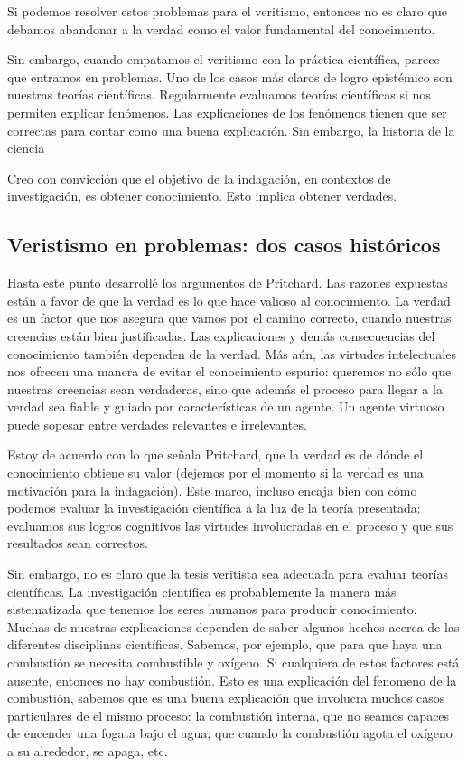 {{{{Si podemos resolver estos problemas para el veritismo, entonces no es claro que debamos abandonar a la verdad como el valor fundamental del conocimiento.

Sin embargo, cuando empatamos el veritismo con la práctica científica, parece que entramos en problemas.
Uno de los casos más claros de logro epistémico son nuestras teorías científicas.
Regularmente evaluamos teorías científicas si nos permiten explicar fenómenos.
Las explicaciones de los fenómenos tienen que ser correctas para contar como una buena explicación.
Sin embargo, la historia de la ciencia

Creo con convicción que el objetivo de la indagación, en contextos de investigación, es obtener conocimiento. Esto implica obtener verdades.

\subsection{Veristismo en problemas: dos casos históricos}

Hasta este punto desarrollé los argumentos de Pritchard.
Las razones expuestas están a favor de que la verdad es lo que hace valioso al conocimiento.
La verdad es un factor que nos asegura que vamos por el camino correcto, cuando nuestras creencias están bien justificadas.
Las explicaciones y demás consecuencias del conocimiento también dependen de la verdad.
Más aún, las virtudes intelectuales nos ofrecen una manera de evitar el conocimiento espurio: queremos no sólo que nuestras creencias sean verdaderas, sino que además el proceso para llegar a la verdad sea fiable y guiado por características de un agente.
Un agente virtuoso puede sopesar entre verdades relevantes e irrelevantes.

Estoy de acuerdo con lo que señala Pritchard, que la verdad es de dónde el conocimiento obtiene su valor (dejemos por el momento si la verdad es una motivación para la indagación).
Este marco, incluso encaja bien con cómo podemos evaluar la investigación científica a la luz de la teoría presentada: evaluamos sus logros cognitivos las virtudes involucradas en el proceso y que sus resultados sean correctos.

Sin embargo, no es claro que la tesis veritista sea adecuada para evaluar teorías científicas.
La investigación científica es probablemente la manera más sistematizada que tenemos los seres humanos para producir conocimiento.
Muchas de nuestras explicaciones dependen de saber algunos hechos acerca de las diferentes disciplinas científicas.
Sabemos, por ejemplo, que para que haya una combustión se necesita combustible y oxígeno.
Si cualquiera de estos factores está ausente, entonces no hay combustión.
Esto es una explicación del fenomeno de la combustión, sabemos que es una buena explicación que involucra muchos casos particulares de el mismo proceso: la combustión interna, que no seamos capaces de encender una fogata bajo el agua; que cuando la combustión agota el oxígeno a su alrededor, se apaga, etc.

}}}}
